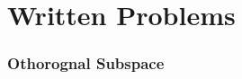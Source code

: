 \documentclass[11pt,a4paper]{article}
\begin{document}
\newpage
\newpage
\part{Written Problems}
\setcounter{section}{0}
\renewcommand{\thesubsection}{(\alph{subsection})}
\section{Othorognal Subspace}
\newcommand{\Ut}{U^{\perp}}
\newcommand{\ut}{u^{\perp}}
\newcommand{\Wt}{W^{\perp}}
\newcommand{\Xt}{X^{\perp}}
\newcommand{\zerovec}{\mathbf{0}} 
\newcommand{\uvec}{\mathbf{u}}
\newcommand{\vvec}{\mathbf{v}}
\newcommand{\wvec}{\mathbf{w}}
\newcommand{\xvec}{\mathbf{x}}
\end{document}
